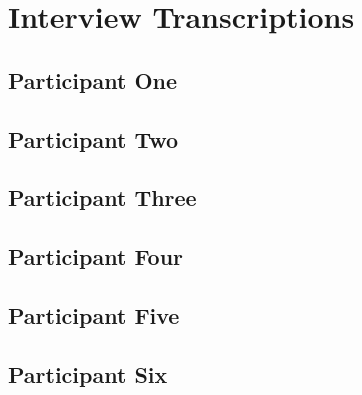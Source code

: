 \chapter{Interview Transcriptions}
\label{appx:transcriptions}
\section{Participant One}


\section{Participant Two}


\section{Participant Three}


\section{Participant Four}


\section{Participant Five}


\section{Participant Six}


